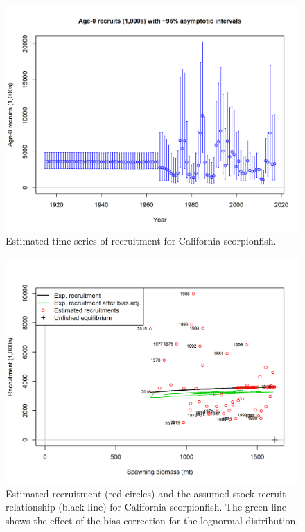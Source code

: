 \documentclass[12pt,]{article}
\begin{document}
\begin{figure}[htbp]
\centering
\includegraphics{r4ss/plots_mod1/ts11_Age-0_recruits_(1000s)_with_95_asymptotic_intervals.png}
\caption{Estimated time-series of recruitment for California
scorpionfish.
\label{fig:ts11_Age-0_recruits_(1000s)_with_95_asymptotic_intervals}}
\end{figure}

\begin{figure}[htbp]
\centering
\includegraphics{r4ss/plots_mod1/SR_curve2.png}
\caption{Estimated recruitment (red circles) and the assumed
stock-recruit relationship (black line) for California scorpionfish. The
green line shows the effect of the bias correction for the lognormal
distribution. \label{fig:SR_curve2}}
\end{figure}
\end{document}
